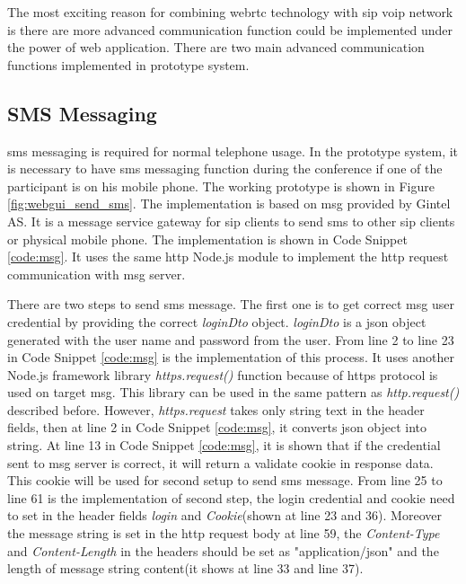 \noindent The most exciting reason for combining \gls{webrtc} technology with \gls{sip} \gls{voip} network is there are more advanced communication function could be implemented under the power of web application. There are two main advanced communication functions implemented in prototype system.

\subsection{SMS Messaging}

\par \gls{sms} messaging is required for normal telephone usage. In the prototype system, it is necessary to have \gls{sms} messaging function during the conference if one of the participant is on his mobile phone. The working prototype is shown in Figure \ref{fig:webgui_send_sms}. The implementation is based on \gls{msg} provided by Gintel AS. It is a message service gateway for \gls{sip} clients to send \gls{sms} to other \gls{sip} clients or physical mobile phone. The implementation is shown in Code Snippet \ref{code:msg}. It uses the same \gls{http} Node.js module to implement the \gls{http} request communication with \gls{msg} server.

\par There are two steps to send \gls{sms} message. The first one is to get correct \gls{msg} user credential by providing the correct \textit{loginDto} object. \textit{loginDto} is a \gls{json} object generated with the user name and password from the user. From line 2 to line 23 in Code Snippet \ref{code:msg} is the implementation of this process. It uses another Node.js framework library \textit{https.request()} function because of \gls{https} protocol is used on target \gls{msg}. This library can be used in the same pattern as \textit{http.request()} described before. However, \textit{https.request} takes only string text in the header fields, then at line 2 in Code Snippet \ref{code:msg}, it converts \gls{json} object into string. At line 13 in Code Snippet \ref{code:msg}, it is shown that if the credential sent to \gls{msg} server is correct, it will return a validate cookie in response data. This cookie will be used for second setup to send \gls{sms} message. From line 25 to line 61 is the implementation of second step, the login credential and cookie need to set in the header fields \textit{login} and \textit{Cookie}(shown at line 23 and 36). Moreover the message string is set in the \gls{http} request body at line 59, the \textit{Content-Type} and \textit{Content-Length} in the headers should be set as "application/json" and the length of message string content(it shows at line 33 and line 37).

